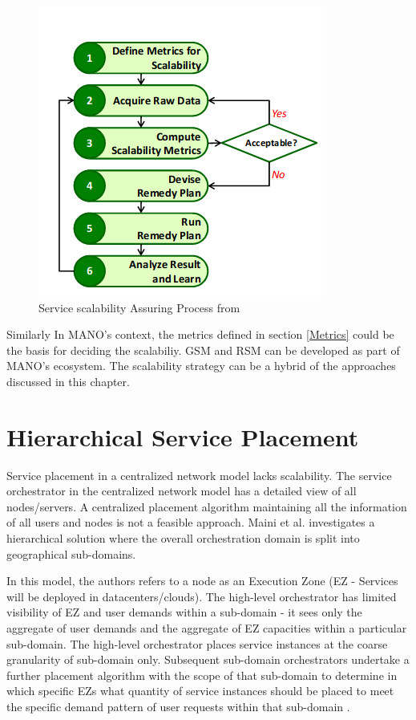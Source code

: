 \begin{enumerate}
\begin{figure}[h]
	\centering
	\includegraphics[width=0.7\linewidth]{figures/ServiceScalability}
	\caption{Service scalability Assuring Process from \cite{lee_software_2010}}
	\label{fig:servicescalability}
\end{figure}

\end{enumerate}

Similarly In MANO's context, the metrics defined in section \ref{Metrics} could be the basis for deciding the scalabiliy. GSM and RSM can be developed as part of MANO's ecosystem. The scalability strategy can be a hybrid of the approaches discussed in this chapter.

\newpage
\section{Hierarchical Service Placement}
Service placement in a centralized network model lacks scalability. The service orchestrator in the centralized network model has a detailed view of all nodes/servers. A centralized placement algorithm maintaining all the information of all users and nodes is not a feasible approach. Maini et al. \cite{maini_hierarchical_2016} investigates a hierarchical solution where the overall orchestration domain is split into geographical sub-domains.

In this model, the authors refers to a node as an Execution Zone (EZ - Services will be deployed in datacenters/clouds). The high-level orchestrator has limited visibility of EZ and user demands within a sub-domain - it sees only the aggregate of user demands and the aggregate of EZ capacities within a particular sub-domain. The high-level orchestrator places service instances at the coarse granularity of sub-domain only. Subsequent sub-domain orchestrators undertake a further placement algorithm with the scope of that sub-domain to determine in which specific EZs what quantity of service instances should be placed to meet the specific demand pattern of user requests within that sub-domain \cite{maini_hierarchical_2016}.

